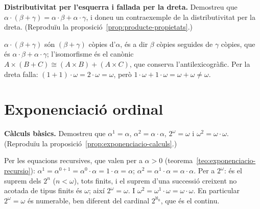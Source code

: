 \begin{exercici}
\textbf{Distributivitat per l'esquerra i fallada per la dreta.} Demostreu que \(\alpha\cdot(\beta+\gamma)=\alpha\cdot\beta+\alpha\cdot\gamma\), i doneu un contraexemple de la distributivitat per la dreta. (Reproduïu la proposició~\ref{prop:producte-propietats}.)
\end{exercici}
\begin{solucio}
\(\alpha\cdot(\beta+\gamma)\) són \((\beta+\gamma)\) còpies d'\(\alpha\), és a dir \(\beta\) còpies seguides de \(\gamma\) còpies, que és \(\alpha\cdot\beta+\alpha\cdot\gamma\); l'isomorfisme és el canònic \(A\times(B+C)\cong(A\times B)+(A\times C)\), que conserva l'antilexicogràfic. Per la dreta falla: \((1+1)\cdot\omega=2\cdot\omega=\omega\), però \(1\cdot\omega+1\cdot\omega=\omega+\omega\neq\omega\).
\end{solucio}

\section{Exponenciació ordinal}\label{prac:exponenciacio-ordinal}

\begin{exercici}
\textbf{Càlculs bàsics.} Demostreu que \(\alpha^1=\alpha\), \(\alpha^2=\alpha\cdot\alpha\), \(2^\omega=\omega\) i \(\omega^2=\omega\cdot\omega\). (Reproduïu la proposició~\ref{prop:exponenciacio-calculs}.)
\end{exercici}
\begin{solucio}
Per les equacions recursives, que valen per a \(\alpha>0\) (teorema~\ref{teo:exponenciacio-recursio}): \(\alpha^1=\alpha^{0+1}=\alpha^0\cdot\alpha=1\cdot\alpha=\alpha\); \(\alpha^2=\alpha^1\cdot\alpha=\alpha\cdot\alpha\). Per a \(2^\omega\): és el suprem dels \(2^n\) (\(n<\omega\)), tots finits, i el suprem d'una successió creixent no acotada de tipus finits és \(\omega\); així \(2^\omega=\omega\). I \(\omega^2=\omega^1\cdot\omega=\omega\cdot\omega\). En particular \(2^\omega=\omega\) és numerable, ben diferent del cardinal \(2^{\aleph_0}\), que és el continu.
\end{solucio}

